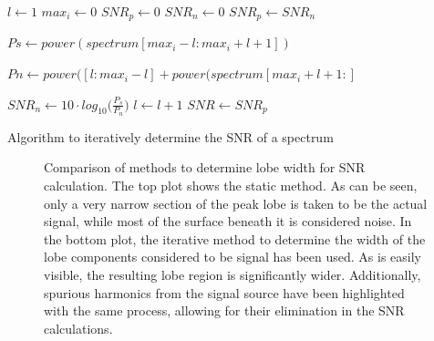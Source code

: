 \begin{algorithm}
    \centering
    \begin{algorithmic}
    \State $l\gets 1$
    \State $max_i\gets 0$
    \State $SNR_p\gets 0$
    \State $SNR_n\gets 0$
        \State $SNR_p\gets SNR_n$

        \State $Ps\gets power(spectrum[max_i - l:max_i + l + 1])$

        \State $Pn\gets power([l:max_i - l] + power(spectrum[max_i + l + 1:]$

        \State $SNR_n\gets 10\cdot log_{10}\Bigg(\frac{P_s}{P_n}\Bigg)$
        \State $l\gets l + 1$
    \EndWhile
    \State $SNR\gets SNR_p$
    \end{algorithmic}
    \caption[Iterative SNR Algorithm]{Algorithm to iteratively determine the SNR of a spectrum}
    \label{alg:gui:snr}
\end{algorithm}

\begin{figure}
    \centering
    
    \caption[SNR comparison]{%
        Comparison of methods to determine lobe width for SNR calculation. The
        top plot shows  the static method. As can be seen,  only a very narrow
        section of the peak lobe is taken  to be the actual signal, while most
        of the surface beneath it is considered noise.\protect\newline
        In  the bottom  plot,  the  iterative method  to  determine the  width
        of  the  lobe  components  considered  to be  signal  has  been  used.
        As  is easily  visible,  the resulting  lobe  region is  significantly
        wider. Additionally, spurious  harmonics from  the signal  source have
        been highlighted with the same process, allowing for their elimination
        in the SNR calculations.%
    }
    \label{fig:gui:snr_comparison}
\end{figure}

